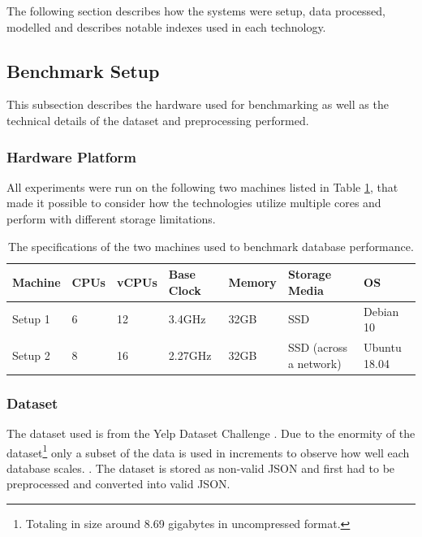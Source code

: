 The following section describes how the systems were setup, data processed, modelled and describes notable indexes used in each technology.

\subsection{Benchmark Setup}

This subsection describes the hardware used for benchmarking as well as the technical details of the dataset and preprocessing performed.

\subsubsection{Hardware Platform}
All experiments were run on the following two machines listed in Table \ref{tab:hardware}, that made it possible to consider how the technologies utilize multiple cores and perform with different storage limitations.

\begin{table}[h]
    \centering
    \caption{The specifications of the two machines used to benchmark database performance.}
    \vspace*{5mm}
    \begin{tabular}{ |p{1.2cm}|p{1.2cm}|p{1.2cm}|p{1.6cm}|p{1.3cm}|p{3.5cm}|p{2cm}|}
        \hline
        \rowcolor{Gray}
        Machine    & CPUs & vCPUs & Base Clock & Memory & Storage Media & OS           \\
        \hline
        Setup 1   & 6    & 12    & 3.4GHz     & 32GB   & SSD                      & Debian 10    \\
        Setup 2   & 8    & 16    & 2.27GHz    & 32GB   & SSD (across a network) & Ubuntu 18.04 \\
        \hline
    \end{tabular}
    \label{tab:hardware}
\end{table}

\subsubsection{Dataset}
The dataset used is from the Yelp Dataset Challenge \cite{yelpdataset}. Due to the enormity of the dataset\footnote{Totaling in size around 8.69 gigabytes in uncompressed format.} only a subset of the data is used in increments to observe how well each database scales. . The dataset is stored as non-valid JSON and first had to be preprocessed and converted into valid JSON.


